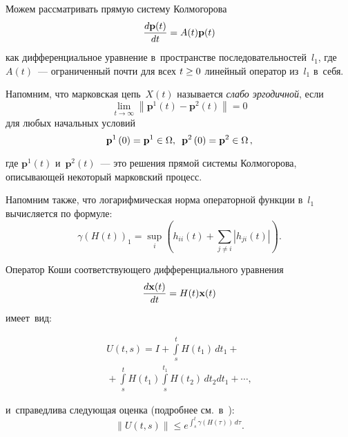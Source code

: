 \begin{multicols}{2}
    Можем рассматривать прямую сис\-те\-му Колмогорова
             $$
             \displaystyle\frac{\displaystyle d\mathbf{p}(t)\mathstrut}{\displaystyle dt\mathstrut}= A(t)\mathbf{p}(t)
             $$
     как дифференциальное урав\-не\-ние в~про\-стран\-ст\-ве по\-сле\-до\-ва\-тель\-но\-стей~$l_1$, 
где $A\left (t\right)$~--- ограниченный почти для всех $ t \hm\ge 0 $ линейный 
оператор из~$l_1$ в~\mbox{себя}.
    
    
    Напомним, что марковская цепь~$X\left(t\right)$ называется \textit{слабо эргодичной}, если
  $$ 
\lim\limits_{t\rightarrow \infty }\left\| \mathbf{p}^1\left( 
t\right)-\mathbf{p}^2\left( t\right) \right\| =0 
$$ 
для любых начальных условий 
$$
\mathbf{p}^1\left( 0\right) =\mathbf{p}^1\in \Omega ,\enskip \mathbf{p}^2\left( 
0\right) =\mathbf{p}^2\in \Omega\,,
$$ 

  \vspace*{-2pt}
    
    \noindent
где $\mathbf{p}^1(t)$ 
и~$\mathbf{p}^2(t)$~--- это решения прямой сис\-те\-мы Колмогорова, опи\-сы\-ва\-ющей 
некоторый марковский про\-цесс.
    
    Напомним также, что логарифмическая норма операторной функции в~$l_1$ 
вы\-чис\-ля\-ет\-ся по фор\-муле:
    \begin{equation*}
        \gamma \left( H\left(t\right) \right)_{1} = \sup\limits_i 
\left(h_{ii}\left(t\right) + \sum\limits_{j\neq i} |h_{ji}\left(t\right)|\right).
    \end{equation*}
    
    \vspace*{-2pt}
    
    \noindent
Оператор Коши со\-от\-вет\-ст\-ву\-юще\-го дифференциального урав\-не\-ния 
$$
\displaystyle\frac{\displaystyle d\mathbf{x}(t)\mathstrut}{\displaystyle dt\mathstrut}=H(t)\mathbf{x}(t)
$$
 име\-ет~вид:
 
 \columnbreak
 
 \noindent
\begin{multline*}
    U\left(t,s\right) = I + \int\limits_{s}^{t}H(t_1)\,dt_1 + {}\\[-1pt]
    {}+ 
\int\limits_{s}^{t}H(t_1)\int\limits_{s}^{t_1}H(t_2)\,dt_2dt_1 + \cdots, 
\end{multline*}

\vspace*{-3pt}

\noindent
и~справедлива сле\-ду\-ющая оцен\-ка (по\-дроб\-нее см.\ в~\cite{ZKKS2016}):
    \begin{equation*}
        \|U\left(t,s\right)\| \le e^{\int\nolimits_s^t \gamma\left(H(\tau)\right)\, d\tau}.     
    \end{equation*}
    

\end{multicols}
